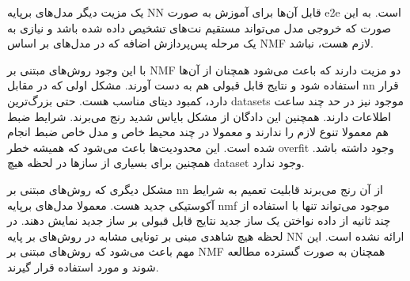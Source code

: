 یک مزیت دیگر مدل‌های برپایه \gls{NN} قابل آن‌ها برای آموزش به صورت \gls{e2e}
است. به این صورت که خروجی مدل می‌تواند مستقیم نت‌های تشخیص داده شده باشد و نیازی
به یک مرحله پس‌پردازش اضافه که در مدل‌های بر اساس \gls{NMF} لازم هست، نباشد.

با این وجود روش‌های مبتنی بر \gls{NMF} دو مزیت دارند که باعث می‌شود همچنان از
آن‌ها استفاده شود و نتایج قابل قبولی هم به دست آورند. مشکل اولی که در مقابل
\gls{nn} قرار دارد، کمبود دیتای مناسب هست. حتی بزرگ‌ترین \glspl{dataset} موجود
نیز در حد چند ساعت اطلاعات دارند. همچنین این دادگان از مشکل بایاس شدید رنج
می‌برند. شرایط ضبط هم معمولا تنوع لازم را ندارند و معمولا در چند محیط خاص و مدل
خاص ضبط انجام شده است. این محدودیت‌ها باعث می‌شود که همیشه خطر \gls{overfit}
وجود داشته باشد. همچنین برای بسیاری از سازها در لحظه هیچ \gls{dataset} وجود
ندارد.

مشکل دیگری که روش‌های مبتنی بر \gls{nn} از آن رنج می‌برند قابلیت تعمیم به شرایط
آکوستیکی جدید هست. معمولا مدل‌های برپایه \gls{nmf} موجود می‌تواند تنها با
استفاده از چند ثانیه از داده نواختن یک ساز جدید نتایج قابل قبولی بر ساز جدید
نمایش دهند. در لحظه هیچ شاهدی مبنی بر تونایی مشابه در روش‌های بر پایه \gls{NN}
ارائه نشده است. این مهم باعث می‌شود که روش‌های مبتنی بر \gls{NMF} همچنان به صورت
گسترده مطالعه شوند و مورد استفاده قرار گیرند.